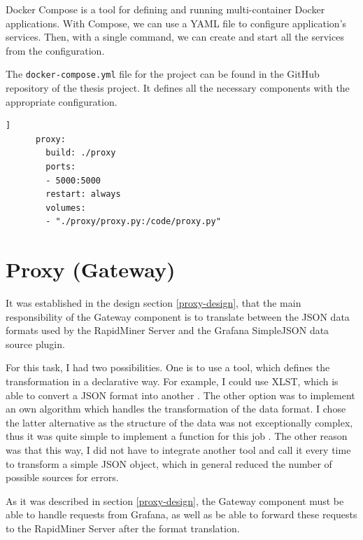 
Docker Compose is a tool for defining and running multi-container Docker applications. With Compose, we can use a YAML file to configure application’s services. Then, with a single command, we can create and start all the services from the configuration.\cite{docker-compose}

The \texttt{docker-compose.yml} file for the project can be found in the GitHub repository of the thesis project. It defines all the necessary components with the appropriate configuration.

\begin{minipage}{\linewidth}
	\begin{lstlisting}[language=docker-compose-proxy, caption={Extract of the \texttt{docker-compose.yml}}, label={lst:proxy-docker-compose}]]	
	  proxy:
	    build: ./proxy
	    ports:
	    - 5000:5000
	    restart: always
	    volumes: 
	    - "./proxy/proxy.py:/code/proxy.py"
	\end{lstlisting}
\end{minipage}

\section{Proxy (Gateway)} \label{proxy-impl}

It was established in the design section \ref{proxy-design}, that the main responsibility of the Gateway component is to translate between the JSON data formats used by the RapidMiner Server and the Grafana SimpleJSON data source plugin.

For this task, I had two possibilities. One is to use a tool, which defines the transformation in a declarative way. For example, I could use XLST, which is able to convert a JSON format into another \cite{xslt}. The other option was to implement an own algorithm which handles the transformation of the data format. I chose the latter alternative as the structure of the data was not exceptionally complex, thus it was quite simple to implement a function for this job . The other reason was that this way, I did not have to integrate another tool and call it every time to transform a simple JSON object, which in general reduced the number of possible sources for errors.


As it was described in section \ref{proxy-design}, the Gateway component must be able to handle requests from Grafana, as well as be able to forward these requests to the RapidMiner Server after the format translation. 

